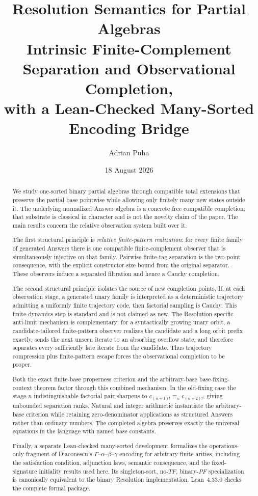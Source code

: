 \documentclass[11pt]{article}
\title{\textbf{Resolution Semantics for Partial Algebras}\\
Intrinsic Finite-Complement Separation and Observational Completion,\\
with a Lean-Checked Many-Sorted Encoding Bridge}
\author{Adrian Puha}
\date{18 August 2026}
\begin{document}
\maketitle

\begin{abstract}
We study one-sorted binary partial algebras through compatible total extensions
that preserve the partial base pointwise while allowing only finitely many new
states outside it.  The underlying normalized Answer algebra is a concrete free
compatible completion; that substrate is classical in character and is not the
novelty claim of the paper.  The main results concern the relative observation
system built over it.

The first structural principle is \emph{relative finite-pattern realization}:
for every finite family of generated Answers there is one compatible
finite-complement observer that is simultaneously injective on that family.
Pairwise finite-tag separation is the two-point consequence, with the explicit
constructor-size bound from the original separator.  These observers induce a
separated filtration and hence a Cauchy completion.

The second structural principle isolates the source of new completion points.
If, at each observation stage, a generated unary family is interpreted as a
deterministic trajectory admitting a uniformly finite trajectory code, then
factorial sampling is Cauchy.  This finite-dynamics step is standard and is not
claimed as new.  The Resolution-specific anti-limit mechanism is complementary:
for a syntactically growing unary orbit, a candidate-tailored finite-pattern
observer realizes the candidate and a long orbit prefix exactly, sends the next
unseen iterate to an absorbing overflow state, and therefore separates every
sufficiently late iterate from the candidate.  Thus trajectory compression plus
finite-pattern escape forces the observational completion to be proper.

Both the exact finite-base properness criterion and the arbitrary-base
base-fixing-context theorem factor through this combined mechanism.  In the
old-fixing case the stage-$n$ indistinguishable factorial pair sharpens to
$c_{(n+1)!}\equiv_n c_{(n+2)!}$, giving unbounded separation ranks.  Natural and
integer arithmetic instantiate the arbitrary-base criterion while retaining
zero-denominator applications as structured Answers rather than ordinary
numbers.  The completed algebra preserves exactly the universal equations in
the language with named base constants.

Finally, a separate Lean-checked many-sorted development formalizes the
operations-only fragment of Diaconescu's $\Gamma$--$\alpha$--$\beta$--$\gamma$
encoding for arbitrary finite arities, including the satisfaction condition,
adjunction laws, semantic consequence, and the fixed-signature initiality
results used here.  Its singleton-sort, no-$TF$, binary-$PF$ specialization is
canonically equivalent to the binary Resolution implementation.  Lean~4.33.0
checks the complete formal package.
\end{abstract}
\end{document}
